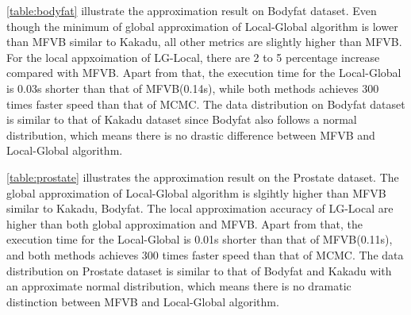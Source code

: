 \autoref{table:bodyfat} illustrate the approximation result on Bodyfat dataset. Even though the minimum of global approximation of Local-Global algorithm is lower than MFVB similar to Kakadu, all other metrics are slightly higher than MFVB. For the local appxoimation of LG-Local, there are 2 to 5 percentage increase compared with MFVB. Apart from that, the execution time for the Local-Global is 0.03s shorter than that of MFVB(0.14s), while both methods achieves 300 times faster speed than that of MCMC.
The data distribution on Bodyfat dataset is similar to that of Kakadu dataset since Bodyfat also follows a normal distribution, which means there is no drastic difference between MFVB and Local-Global algorithm.
\begin{table}[!h]
	\caption{Experiment Result on Prostate dataset}
	\label{table:prostate}
\end{table}

\autoref{table:prostate} illustrates the approximation result on the Prostate dataset.  The global approximation of Local-Global algorithm is slgihtly higher than MFVB similar to Kakadu, Bodyfat. The local approximation accuracy of LG-Local are higher than both global approximation and MFVB. Apart from that, the execution time for the Local-Global is 0.01s shorter than that of MFVB(0.11s), and both methods achieves 300 times faster speed than that of MCMC.
The data distribution on Prostate dataset is similar to that of Bodyfat and Kakadu with an approximate normal distribution, which means there is no dramatic distinction between MFVB and Local-Global algorithm.

